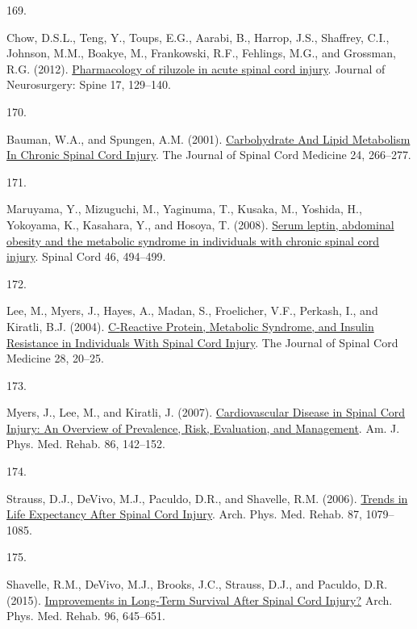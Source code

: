 \documentclass[
]{article}
\newlength{\cslhangindent}
\newlength{\csllabelwidth}
\newlength{\cslentryspacingunit} %
\newenvironment{CSLReferences}[2] %
 {%
  \setlength{\parindent}{0pt}
  \ifodd #1
  \let\oldpar\par
  \def\par{\hangindent=\cslhangindent\oldpar}
  \fi
  \setlength{\parskip}{#2\cslentryspacingunit}
 }%
 {}
\newcommand{\CSLLeftMargin}[1]{\parbox[t]{\csllabelwidth}{#1}}
\newcommand{\CSLRightInline}[1]{\parbox[t]{\linewidth - \csllabelwidth}{#1}\break}
\begin{document}
\begin{CSLReferences}{0}{0}
\leavevmode{}%
\CSLLeftMargin{169. }
\CSLRightInline{Chow, D.S.L., Teng, Y., Toups, E.G., Aarabi, B., Harrop, J.S., Shaffrey, C.I., Johnson, M.M., Boakye, M., Frankowski, R.F., Fehlings, M.G., and Grossman, R.G. (2012). \href{https://doi.org/10.3171/2012.5.AOSPINE12112}{Pharmacology of riluzole in acute spinal cord injury}. Journal of Neurosurgery: Spine 17, 129--140.}

\leavevmode{}%
\CSLLeftMargin{170. }
\CSLRightInline{Bauman, W.A., and Spungen, A.M. (2001). \href{https://doi.org/10.1080/10790268.2001.11753584}{Carbohydrate {And Lipid Metabolism In Chronic Spinal Cord Injury}}. The Journal of Spinal Cord Medicine 24, 266--277.}

\leavevmode{}%
\CSLLeftMargin{171. }
\CSLRightInline{Maruyama, Y., Mizuguchi, M., Yaginuma, T., Kusaka, M., Yoshida, H., Yokoyama, K., Kasahara, Y., and Hosoya, T. (2008). \href{https://doi.org/10.1038/sj.sc.3102171}{Serum leptin, abdominal obesity and the metabolic syndrome in individuals with chronic spinal cord injury}. Spinal Cord 46, 494--499.}

\leavevmode{}%
\CSLLeftMargin{172. }
\CSLRightInline{Lee, M., Myers, J., Hayes, A., Madan, S., Froelicher, V.F., Perkash, I., and Kiratli, B.J. (2004). \href{https://doi.org/10.1080/10790268.2005.11753794}{C-{Reactive Protein}, {Metabolic Syndrome}, and {Insulin Resistance} in {Individuals With Spinal Cord Injury}}. The Journal of Spinal Cord Medicine 28, 20--25.}

\leavevmode{}%
\CSLLeftMargin{173. }
\CSLRightInline{Myers, J., Lee, M., and Kiratli, J. (2007). \href{https://doi.org/10.1097/PHM.0b013e31802f0247}{Cardiovascular {Disease} in {Spinal Cord Injury}: {An Overview} of {Prevalence}, {Risk}, {Evaluation}, and {Management}}. Am. J. Phys. Med. Rehab. 86, 142--152.}

\leavevmode{}%
\CSLLeftMargin{174. }
\CSLRightInline{Strauss, D.J., DeVivo, M.J., Paculdo, D.R., and Shavelle, R.M. (2006). \href{https://doi.org/10.1016/j.apmr.2006.04.022}{Trends in {Life Expectancy After Spinal Cord Injury}}. Arch. Phys. Med. Rehab. 87, 1079--1085.}

\leavevmode{}%
\CSLLeftMargin{175. }
\CSLRightInline{Shavelle, R.M., DeVivo, M.J., Brooks, J.C., Strauss, D.J., and Paculdo, D.R. (2015). \href{https://doi.org/10.1016/j.apmr.2014.11.003}{Improvements in {Long-Term Survival After Spinal Cord Injury}?} Arch. Phys. Med. Rehab. 96, 645--651.}


\end{CSLReferences}
\end{document}
